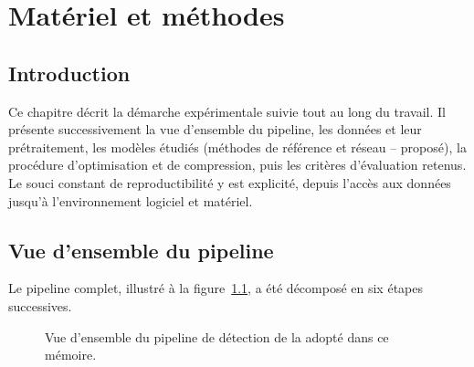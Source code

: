 \chapter{Matériel et méthodes}
\label{ch:methodes}

\section{Introduction}
\label{sec:meth:intro}
Ce chapitre décrit la démarche expérimentale suivie tout au long du travail. Il présente successivement la vue d'ensemble du pipeline, les données et leur prétraitement, les modèles étudiés (méthodes de référence et réseau \CNN--\LSTM{} proposé), la procédure d'optimisation et de compression, puis les critères d'évaluation retenus. Le souci constant de reproductibilité y est explicité, depuis l'accès aux données jusqu'à l'environnement logiciel et matériel.

\section{Vue d'ensemble du pipeline}
\label{sec:meth:pipeline}

Le pipeline complet, illustré à la figure~\ref{fig:meth:pipeline}, a été décomposé en six étapes successives.

\begin{figure}[H]
  \centering
  \caption{Vue d'ensemble du pipeline de détection de la \FA{} adopté dans ce mémoire.}
  \label{fig:meth:pipeline}
\end{figure}

